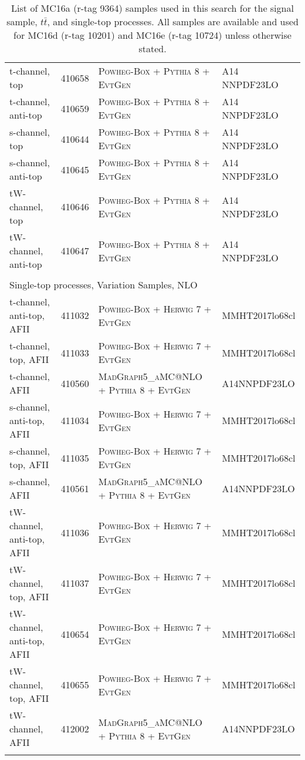\begin{table}[h!]
\begin{center}
{\begin{tabular}{@{} lcll @{}}
t-channel, top & 410658 & \textsc{Powheg-Box + Pythia 8 + EvtGen} & A14 NNPDF23LO \\
t-channel, anti-top & 410659 & \textsc{Powheg-Box + Pythia 8 + EvtGen} & A14 NNPDF23LO \\
s-channel, top & 410644 & \textsc{Powheg-Box + Pythia 8 + EvtGen} & A14 NNPDF23LO \\
s-channel, anti-top & 410645 & \textsc{Powheg-Box + Pythia 8 + EvtGen} & A14 NNPDF23LO \\
tW-channel, top & 410646 & \textsc{Powheg-Box + Pythia 8 + EvtGen} & A14 NNPDF23LO \\
tW-channel, anti-top & 410647 & \textsc{Powheg-Box + Pythia 8 + EvtGen} & A14 NNPDF23LO \\ \hline \\
\multicolumn{4}{l}{Single-top processes, Variation Samples, NLO} \\ \hline
t-channel, anti-top, AFII & 411032 &\textsc{Powheg-Box + Herwig 7 + EvtGen} & MMHT2017lo68cl \\
t-channel, top, AFII & 411033 & \textsc{Powheg-Box + Herwig 7 + EvtGen} & MMHT2017lo68cl \\
t-channel, AFII & 410560 & \textsc{MadGraph5\_aMC@NLO + Pythia 8 + EvtGen} & A14NNPDF23LO \\ 
s-channel, anti-top, AFII & 411034 &\textsc{Powheg-Box + Herwig 7 + EvtGen} & MMHT2017lo68cl \\
s-channel, top, AFII & 411035 & \textsc{Powheg-Box + Herwig 7 + EvtGen} & MMHT2017lo68cl \\
s-channel, AFII & 410561 & \textsc{MadGraph5\_aMC@NLO + Pythia 8 + EvtGen} & A14NNPDF23LO \\ 
tW-channel, anti-top, AFII & 411036 &\textsc{Powheg-Box + Herwig 7 + EvtGen} & MMHT2017lo68cl \\
tW-channel, top, AFII & 411037 & \textsc{Powheg-Box + Herwig 7 + EvtGen} & MMHT2017lo68cl \\
tW-channel, anti-top, AFII & 410654 &\textsc{Powheg-Box + Herwig 7 + EvtGen} & MMHT2017lo68cl \\
tW-channel, top, AFII & 410655 & \textsc{Powheg-Box + Herwig 7 + EvtGen} & MMHT2017lo68cl \\
tW-channel, AFII & 412002& \textsc{MadGraph5\_aMC@NLO + Pythia 8 + EvtGen} & A14NNPDF23LO \\ 
 \hhline{====}
\end{tabular}
\caption{List of MC16a (r-tag  9364) samples used in this search for the signal sample, $t\bar{t}$, and single-top processes.  All samples are available and used for MC16d (r-tag 10201) and MC16e (r-tag 10724) unless otherwise stated.}
\label{tab:MCSample1}
}
\end{center}
\end{table}


